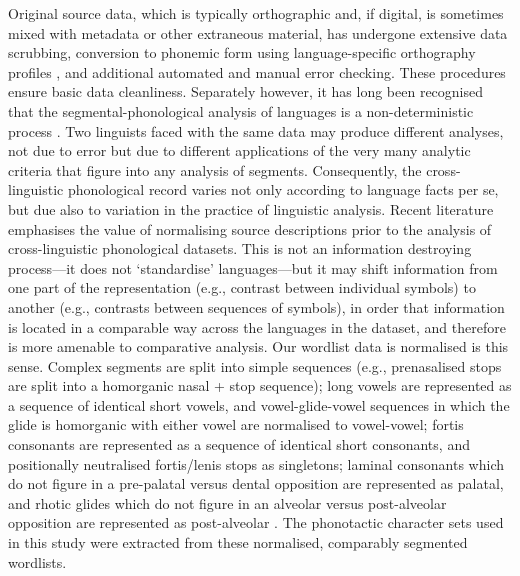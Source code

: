 Original source data, which is typically orthographic and, if digital, is sometimes mixed with metadata or other extraneous material, has undergone extensive data scrubbing, conversion to phonemic form using language-specific orthography profiles \autocite{moran_unicode_2018}, and additional automated and manual error checking. These procedures ensure basic data cleanliness. Separately however, it has long been recognised that the segmental-phonological analysis of languages is a non-deterministic process \autocites{chao_non-uniqueness_1934}{hockett_problem_1963}{hyman_universals_2008}{dresher_contrastive_2009}. Two linguists faced with the same data may produce different analyses, not due to error but due to different applications of the very many analytic criteria that figure into any analysis of segments. Consequently, the cross-linguistic phonological record varies not only according to language facts per se, but due also to variation in the practice of linguistic analysis. Recent literature \autocites{lass_vowel_1984}{hyman_universals_2008}{van_der_hulst_phonological_2017}{round_matthew_2017}{kiparsky_formal_2018} emphasises the value of normalising source descriptions prior to the analysis of cross-linguistic phonological datasets. This is not an information destroying process---it does not `standardise' languages---but it may shift information from one part of the representation (e.g., contrast between individual symbols) to another (e.g., contrasts between sequences of symbols), in order that information is located in a comparable way across the languages in the dataset, and therefore is more amenable to comparative analysis. Our wordlist data is normalised is this sense. Complex segments are split into simple sequences (e.g., prenasalised stops are split into a homorganic nasal + stop sequence); long vowels are represented as a sequence of identical short vowels, and vowel-glide-vowel sequences in which the glide is homorganic with either vowel are normalised to vowel-vowel; fortis consonants are represented as a sequence of identical short consonants, and positionally neutralised fortis/lenis stops as singletons; laminal consonants which do not figure in a pre-palatal versus dental opposition are represented as palatal, and rhotic glides which do not figure in an alveolar versus post-alveolar opposition are represented as post-alveolar \autocites[see also][]{round_phonemic_2019}{round_australian_2019}. The phonotactic character sets used in this study were extracted from these normalised, comparably segmented wordlists.

